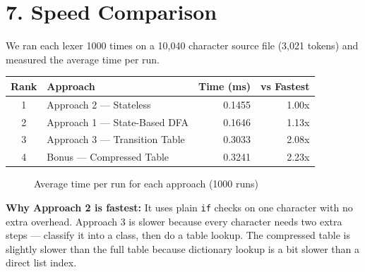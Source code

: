 \documentclass[12pt, a4paper]{article}
\begin{document}
\section*{7. Speed Comparison}

We ran each lexer 1000 times on a 10,040 character source file
(3,021 tokens) and measured the average time per run.

\begin{center}
\begin{tabular}{clrr}
\toprule
Rank & Approach & Time (ms) & vs Fastest \\
\midrule
1 & Approach 2 — Stateless        & 0.1455 & 1.00x \\
2 & Approach 1 — State-Based DFA  & 0.1646 & 1.13x \\
3 & Approach 3 — Transition Table & 0.3033 & 2.08x \\
4 & Bonus — Compressed Table      & 0.3241 & 2.23x \\
\bottomrule
\end{tabular}
\end{center}

\begin{figure}[H]
\centering
{}
\caption{Average time per run for each approach (1000 runs)}
\end{figure}

\textbf{Why Approach 2 is fastest:} It uses plain \texttt{if} checks
on one character with no extra overhead. Approach 3 is slower because
every character needs two extra steps — classify it into a class, then
do a table lookup. The compressed table is slightly slower than the
full table because dictionary lookup is a bit slower than a direct
list index.
\end{document}
